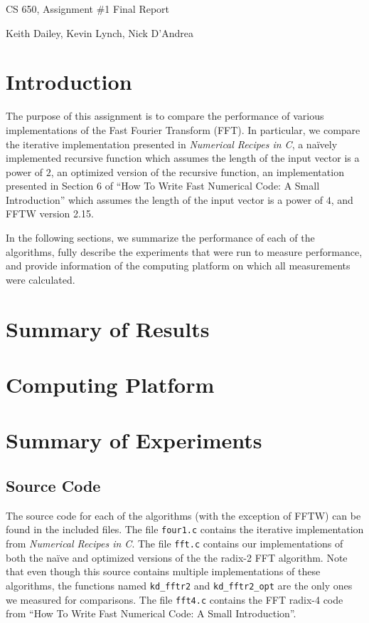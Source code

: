 \documentclass[11 pt]{article}
\author{Keith Dailey}
\title{}
\date{}
\newcommand{\response}{\vspace{.2in}}
\begin{document}
\centerline{\Large{CS 650, Assignment \#1 Final Report}}
\centerline{\large{Keith Dailey, Kevin Lynch, Nick D'Andrea}}

\response

\section{Introduction}

The purpose of this assignment is to compare the performance of various
implementations of the Fast Fourier Transform (FFT).  In particular, we compare
the iterative implementation presented in \emph{Numerical Recipes in C}, a
na\"{i}vely implemented recursive function which assumes the length of the input
vector is a power of $2$, an optimized version of the recursive function, an
implementation presented in Section 6 of ``How To Write Fast Numerical Code: A
Small Introduction'' which assumes the length of the input vector is a power of
$4$, and FFTW version 2.15.

In the following sections, we summarize the performance of each of the
algorithms, fully describe the experiments that were run to measure
performance, and provide information of the computing platform on which all
measurements were calculated.


\section{Summary of Results}

\section{Computing Platform}

\section{Summary of Experiments}

\subsection{Source Code}
The source code for each of the algorithms (with the exception of FFTW) can be
found in the included files.  The file {\tt four1.c} contains the iterative
implementation from \emph{Numerical Recipes in C}.  The file {\tt fft.c}
contains our implementations of both the na\"{i}ve and optimized versions of the
the radix-2 FFT algorithm.  Note that even though this source contains multiple
implementations of these algorithms, the functions named {\tt kd\_fftr2} and
{\tt kd\_fftr2\_opt} are the only ones we measured for comparisons.  The file
{\tt fft4.c} contains the FFT radix-4 code from ``How To Write Fast Numerical
Code: A Small Introduction''.
\end{document}
